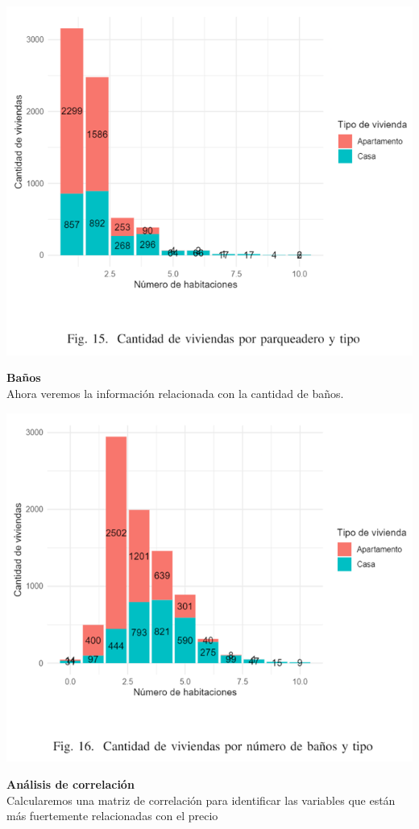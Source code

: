 \documentclass[conference,final,]{IEEEtran}
\begin{document}
\includegraphics[width=1\linewidth]{images/ParqueaderosPorTipo}

\textbf{Baños}\\
Ahora veremos la información relacionada con la cantidad de baños.

\includegraphics[width=1\linewidth]{images/BaniosPorTipo}

\textbf{Análisis de correlación}\\
Calcularemos una matriz de correlación para identificar las variables
que están más fuertemente relacionadas con el precio
\end{document}
